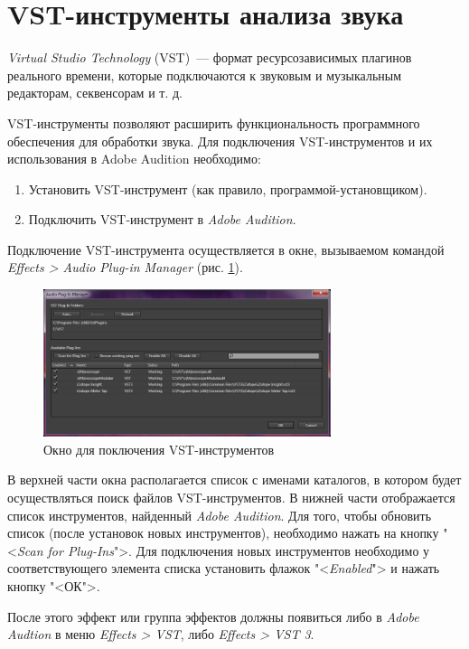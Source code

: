 \documentclass[oneside, final, 14pt]{extreport}
\begin{document}
\section{VST-инструменты анализа звука}

\textit{Virtual Studio Technology} (VST)~--- формат ресурсозависимых плагинов реального времени, которые подключаются к звуковым и музыкальным редакторам, секвенсорам и т. д.

VST-инструменты позволяют расширить функциональность программного обеспечения для обработки звука. Для подключения VST-инструментов и их использования в Adobe Audition необходимо:
\begin{enumerate}
\item Установить VST-инструмент (как правило, программой-установщиком).
\item Подключить VST-инструмент в \textit{Adobe Audition}.
\end{enumerate}

Подключение VST-инструмента осуществляется в окне, вызываемом командой \textit{Effects > Audio Plug-in Manager} (рис. \ref{pic-plugin-01}). 

\begin{figure}[h!]
\centering
\includegraphics[width=0.75\textwidth]{pic-plugin-01}
\caption{Окно для поключения VST-инструментов}
\label{pic-plugin-01}
\end{figure}

В верхней части окна располагается список с именами каталогов, в котором будет осуществляться поиск файлов VST-инструментов. В нижней части отображается список инструментов, найденный \textit{Adobe Audition}. Для того, чтобы обновить список (после установок новых инструментов), необходимо нажать на кнопку "<\textit{Scan for Plug-Ins}">. Для подключения новых инструментов необходимо у соответствующего элемента списка установить флажок "<\textit{Enabled}"> и нажать кнопку "<ОК">.

После этого эффект или группа эффектов должны появиться либо в \textit{Adobe Audtion} в меню \textit{Effects > VST}, либо \textit{Effects > VST 3}.
\end{document}

